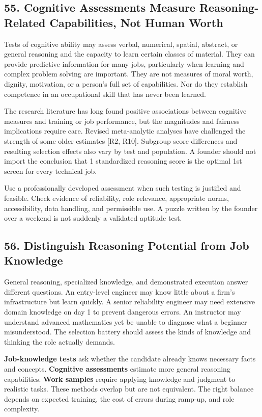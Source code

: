 \subsection*{55. Cognitive Assessments Measure Reasoning-Related Capabilities, Not Human Worth}

Tests of cognitive ability may assess verbal, numerical, spatial, abstract, or general reasoning and the capacity to learn certain classes of material. They can provide predictive information for many jobs, particularly when learning and complex problem solving are important. They are not measures of moral worth, dignity, motivation, or a person's full set of capabilities. Nor do they establish competence in an occupational skill that has never been learned.

The research literature has long found positive associations between cognitive measures and training or job performance, but the magnitudes and fairness implications require care. Revised meta-analytic analyses have challenged the strength of some older estimates [R2, R10]. Subgroup score differences and resulting selection effects also vary by test and population. A founder should not import the conclusion that 1 standardized reasoning score is the optimal 1st screen for every technical job.

Use a professionally developed assessment when such testing is justified and feasible. Check evidence of reliability, role relevance, appropriate norms, accessibility, data handling, and permissible use. A puzzle written by the founder over a weekend is not suddenly a validated aptitude test.

\subsection*{56. Distinguish Reasoning Potential from Job Knowledge}

General reasoning, specialized knowledge, and demonstrated execution answer different questions. An entry-level engineer may know little about a firm's infrastructure but learn quickly. A senior reliability engineer may need extensive domain knowledge on day 1 to prevent dangerous errors. An instructor may understand advanced mathematics yet be unable to diagnose what a beginner misunderstood. The selection battery should assess the kinds of knowledge and thinking the role actually demands.

\textbf{Job-knowledge tests} ask whether the candidate already knows necessary facts and concepts. \textbf{Cognitive assessments} estimate more general reasoning capabilities. \textbf{Work samples} require applying knowledge and judgment to realistic tasks. These methods overlap but are not equivalent. The right balance depends on expected training, the cost of errors during ramp-up, and role complexity.

